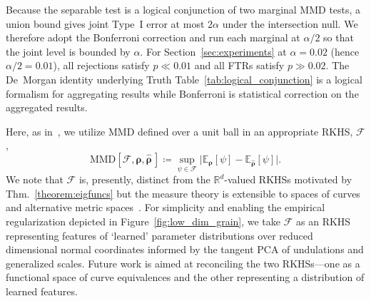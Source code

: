 \documentclass[pdflatex,iicol]{sn-jnl}%
\theoremstyle{thmstyleone}%
\theoremstyle{thmstyletwo}%
\theoremstyle{thmstylethree}%
\begin{document}
Because the separable test is a logical conjunction of two marginal MMD tests, a union bound gives joint Type~I error at most $2\alpha$ under the intersection null. We therefore adopt the Bonferroni correction and run each marginal at $\alpha/2$ so that the joint level is bounded by $\alpha$. For Section~\ref{sec:experiments} at $\alpha=0.02$ (hence $\alpha/2=0.01$), all rejections satisfy $p\ll 0.01$ and all FTRs satisfy $p\gg 0.02$. The De~Morgan identity underlying Truth Table~\ref{tab:logical_conjunction} is a logical formalism for aggregating results while Bonferroni is statistical correction on the aggregated results.

Here, as in~\cite{gretton2012kernel}, we utilize MMD defined over a unit ball in an appropriate RKHS, $\mathcal{F}$, 
\begin{equation} \label{eq:MMD}
    \text{MMD}[\mathcal{F},\boldsymbol{\rho},\widehat{\boldsymbol{\rho}}\,] \coloneqq \sup_{\psi \in \mathcal{F}} \vert \mathbb{E}_{\boldsymbol{\rho}}[\psi] - \mathbb{E}_{ \widehat{\boldsymbol{\rho}}}[\psi] \vert.
\end{equation}
We note that $\mathcal{F}$ is, presently, distinct from the $\mathbb{R}^d$-valued RKHSs motivated by Thm.~\ref{theorem:eigfuncs} but the measure theory is extensible to spaces of curves and alternative metric spaces~\cite{zhang2022nonparametric, RizzoDISCO2010}. For simplicity and enabling the empirical regularization depicted in Figure~\ref{fig:low_dim_grain}, we take $\mathcal{F}$ as an RKHS representing features of `learned' parameter distributions over reduced dimensional normal coordinates informed by the tangent PCA of undulations and generalized scales. Future work is aimed at reconciling the two RKHSs---one as a functional space of curve equivalences and the other representing a distribution of learned features.
\end{document}
